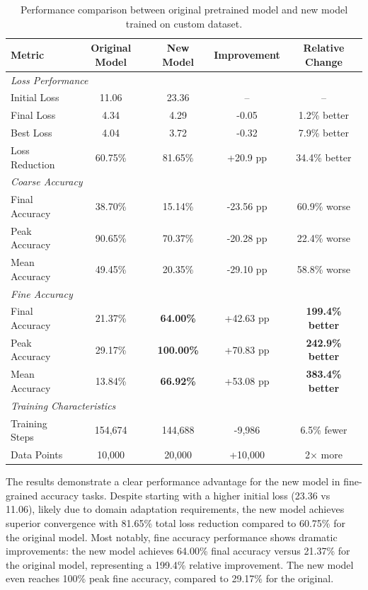 \begin{table}[htbp]
\centering
\caption{Performance comparison between original pretrained model and new model trained on custom dataset.}
\label{tab:performance_comparison}
\begin{tabular}{lcccc}
\toprule
\textbf{Metric} & \textbf{Original Model} & \textbf{New Model} & \textbf{Improvement} & \textbf{Relative Change} \\
\midrule
\multicolumn{5}{l}{\textit{Loss Performance}} \\
Initial Loss & 11.06 & 23.36 & -- & -- \\
Final Loss & 4.34 & 4.29 & -0.05 & 1.2\% better \\
Best Loss & 4.04 & 3.72 & -0.32 & 7.9\% better \\
Loss Reduction & 60.75\% & 81.65\% & +20.9 pp & 34.4\% better \\
\midrule
\multicolumn{5}{l}{\textit{Coarse Accuracy}} \\
Final Accuracy & 38.70\% & 15.14\% & -23.56 pp & 60.9\% worse \\
Peak Accuracy & 90.65\% & 70.37\% & -20.28 pp & 22.4\% worse \\
Mean Accuracy & 49.45\% & 20.35\% & -29.10 pp & 58.8\% worse \\
\midrule
\multicolumn{5}{l}{\textit{Fine Accuracy}} \\
Final Accuracy & 21.37\% & \textbf{64.00\%} & +42.63 pp & \textbf{199.4\% better} \\
Peak Accuracy & 29.17\% & \textbf{100.00\%} & +70.83 pp & \textbf{242.9\% better} \\
Mean Accuracy & 13.84\% & \textbf{66.92\%} & +53.08 pp & \textbf{383.4\% better} \\
\midrule
\multicolumn{5}{l}{\textit{Training Characteristics}} \\
Training Steps & 154,674 & 144,688 & -9,986 & 6.5\% fewer \\
Data Points & 10,000 & 20,000 & +10,000 & 2× more \\
\bottomrule
\end{tabular}
\end{table}

The results demonstrate a clear performance advantage for the new model in fine-grained accuracy tasks. Despite starting with a higher initial loss (23.36 vs 11.06), likely due to domain adaptation requirements, the new model achieves superior convergence with 81.65\% total loss reduction compared to 60.75\% for the original model. Most notably, fine accuracy performance shows dramatic improvements: the new model achieves 64.00\% final accuracy versus 21.37\% for the original model, representing a 199.4\% relative improvement. The new model even reaches 100\% peak fine accuracy, compared to 29.17\% for the original.

